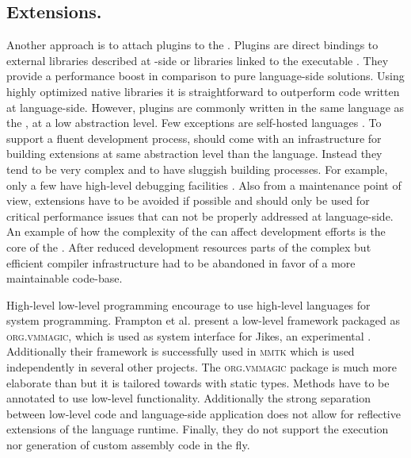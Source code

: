\subsection{\VM Extensions.}

Another approach is to attach plugins to the \VM.
Plugins are direct bindings to external libraries described at \VM-side or libraries linked to the \VM executable \cite[Ch.\ 5]{Blac09a}. 
They provide a performance boost in comparison to pure language-side solutions.
Using highly optimized native libraries it is straightforward to outperform code written at language-side.
However, plugins are commonly written in the same language as the \VM, at a low abstraction level.
Few exceptions are self-hosted languages \cite{Unga05a,Wimm13a,Rigo06a}.
To support a fluent development process, \VMs should come with an infrastructure for building extensions at same abstraction level than the language.
Instead they tend to be very complex and to have sluggish building processes. For example, only a few \VMs have high-level debugging facilities \cite{Inga97a,Unga05a,Wimm13a}.
Also from a \VM maintenance point of view, extensions have to be avoided if possible and should only be used for critical performance issues that can not be properly addressed at language-side.
An example of how the complexity of the \VM can affect development efforts is the core of the \Self \VM \cite{Unga07a}.
After reduced development resources parts of the complex but efficient compiler infrastructure had to be abandoned in favor of a more maintainable code-base.

High-level low-level programming \cite{Fram09a} encourage to use high-level languages for system programming.
Frampton et al. present a low-level framework packaged as \textsc{org.vmmagic}, which is used as system interface for Jikes, an experimental \Java \VM.
Additionally their framework is successfully used in \textsc{mmtk} \cite{Blac04a} which is used independently in several other projects.
The \textsc{org.vmmagic} package is much more elaborate than \B but it is tailored towards \Java with static types.
Methods have to be annotated to use low-level functionality.
Additionally the strong separation between low-level code and language-side application does not allow for reflective extensions of the language runtime.
Finally, they do not support the execution nor generation of custom assembly code in the fly.

